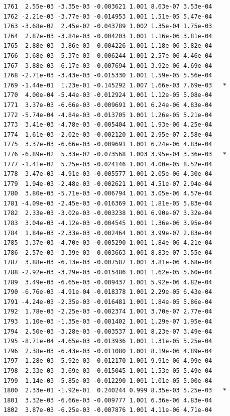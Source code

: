 \documentclass[
  letterpaper,
  DIV=11,
  numbers=noendperiod]{scrartcl}
\begin{document}
\begin{verbatim}
1761  2.55e-03 -3.35e-03 -0.003621 1.001 8.63e-07 3.53e-04    
1762 -2.21e-03 -3.77e-03 -0.014953 1.001 1.51e-05 5.47e-04    
1763 -3.68e-02  2.45e-02 -0.043789 1.002 1.35e-04 1.75e-03    
1764  2.87e-03 -3.84e-03 -0.004203 1.001 1.16e-06 3.81e-04    
1765  2.88e-03 -3.86e-03 -0.004226 1.001 1.18e-06 3.82e-04    
1766  3.68e-03 -5.37e-03 -0.006244 1.001 2.57e-06 4.46e-04    
1767  3.88e-03 -6.17e-03 -0.007694 1.001 3.92e-06 4.69e-04    
1768 -2.71e-03 -3.43e-03 -0.015330 1.001 1.59e-05 5.56e-04    
1769 -1.44e-01  1.23e-01 -0.145292 1.007 1.66e-03 7.69e-03   *
1770  4.00e-04 -5.44e-03 -0.012924 1.001 1.12e-05 5.08e-04    
1771  3.37e-03 -6.66e-03 -0.009691 1.001 6.24e-06 4.83e-04    
1772 -5.74e-04 -4.84e-03 -0.013705 1.001 1.26e-05 5.21e-04    
1773  3.41e-03 -4.78e-03 -0.005404 1.001 1.93e-06 4.25e-04    
1774  1.61e-03 -2.02e-03 -0.002120 1.001 2.95e-07 2.58e-04    
1775  3.37e-03 -6.66e-03 -0.009691 1.001 6.24e-06 4.83e-04    
1776 -6.89e-02  5.33e-02 -0.073568 1.003 3.95e-04 3.36e-03   *
1777 -1.41e-02  5.25e-03 -0.024146 1.001 4.00e-05 8.52e-04    
1778  3.47e-03 -4.91e-03 -0.005577 1.001 2.05e-06 4.30e-04    
1779  1.94e-03 -2.48e-03 -0.002621 1.001 4.51e-07 2.94e-04    
1780  3.80e-03 -5.71e-03 -0.006794 1.001 3.05e-06 4.57e-04    
1781 -4.09e-03 -2.45e-03 -0.016369 1.001 1.81e-05 5.83e-04    
1782  2.33e-03 -3.02e-03 -0.003238 1.001 6.90e-07 3.32e-04    
1783  3.04e-03 -4.12e-03 -0.004545 1.001 1.36e-06 3.95e-04    
1784  1.84e-03 -2.33e-03 -0.002464 1.001 3.99e-07 2.83e-04    
1785  3.37e-03 -4.70e-03 -0.005290 1.001 1.84e-06 4.21e-04    
1786  2.57e-03 -3.39e-03 -0.003663 1.001 8.83e-07 3.55e-04    
1787  3.88e-03 -6.13e-03 -0.007587 1.001 3.81e-06 4.68e-04    
1788 -2.92e-03 -3.29e-03 -0.015486 1.001 1.62e-05 5.60e-04    
1789  3.49e-03 -6.65e-03 -0.009437 1.001 5.92e-06 4.82e-04    
1790 -6.76e-03 -4.91e-04 -0.018378 1.001 2.29e-05 6.43e-04    
1791 -4.24e-03 -2.35e-03 -0.016481 1.001 1.84e-05 5.86e-04    
1792  1.78e-03 -2.25e-03 -0.002374 1.001 3.70e-07 2.77e-04    
1793  1.10e-03 -1.35e-03 -0.001402 1.001 1.29e-07 1.95e-04    
1794  2.50e-03 -3.28e-03 -0.003537 1.001 8.23e-07 3.49e-04    
1795 -8.71e-04 -4.65e-03 -0.013936 1.001 1.31e-05 5.25e-04    
1796  2.38e-03 -6.43e-03 -0.011080 1.001 8.19e-06 4.89e-04    
1797  1.28e-03 -5.92e-03 -0.012170 1.001 9.91e-06 4.99e-04    
1798 -2.33e-03 -3.69e-03 -0.015045 1.001 1.53e-05 5.49e-04    
1799  1.14e-03 -5.85e-03 -0.012290 1.001 1.01e-05 5.00e-04    
1800  2.33e-01 -1.92e-01  0.240244 0.999 8.35e-03 5.25e-03   *
1801  3.32e-03 -6.66e-03 -0.009777 1.001 6.36e-06 4.83e-04    
1802  3.87e-03 -6.25e-03 -0.007876 1.001 4.11e-06 4.71e-04    

\end{verbatim}
\end{document}
